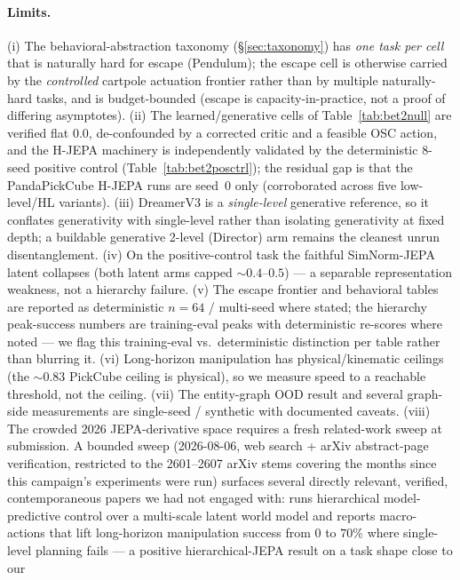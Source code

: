 \documentclass{article}
\begin{document}
\paragraph{Limits.}
(i) The behavioral-abstraction taxonomy (\S\ref{sec:taxonomy}) has
\emph{one task per cell} that is naturally hard for escape (Pendulum); the escape
cell is otherwise carried by the \emph{controlled} cartpole actuation frontier
rather than by multiple naturally-hard tasks, and is budget-bounded (escape is
capacity-in-practice, not a proof of differing asymptotes).
(ii) The learned/generative cells of Table~\ref{tab:bet2null} are verified flat
$0.0$, de-confounded by a corrected critic and a feasible OSC action, and the
H-JEPA machinery is independently validated by the deterministic $8$-seed positive
control (Table~\ref{tab:bet2posctrl}); the residual gap is that the PandaPickCube
H-JEPA runs are seed~0 only (corroborated across five low-level/HL variants).
(iii) DreamerV3 is a \emph{single-level} generative reference, so it conflates
generativity with single-level rather than isolating generativity at fixed depth;
a buildable generative 2-level (Director) arm remains the cleanest unrun
disentanglement. (iv) On the positive-control task the faithful SimNorm-JEPA latent
collapses (both latent arms capped ${\sim}0.4$--$0.5$) --- a separable
representation weakness, not a hierarchy failure.
(v) The escape frontier and behavioral tables are reported as deterministic
$n=64$ / multi-seed where stated; the hierarchy peak-success numbers are
training-eval peaks with deterministic re-scores where noted --- we flag this
training-eval vs.\ deterministic distinction per table rather than blurring it.
(vi) Long-horizon manipulation has physical/kinematic ceilings (the ${\sim}0.83$
PickCube ceiling is physical), so we measure speed to a reachable threshold, not
the ceiling. (vii) The entity-graph OOD result and several graph-side measurements
are single-seed / synthetic with documented caveats. (viii) The crowded 2026
JEPA-derivative space requires a fresh related-work sweep at submission. A bounded
sweep (2026-08-06, web search + arXiv abstract-page verification, restricted to
the 2601--2607 arXiv stems covering the months since this campaign's experiments
were run) surfaces several directly relevant, verified, contemporaneous papers we
had not engaged with: \citet{hwm2026} runs hierarchical model-predictive control
over a multi-scale latent world model and reports macro-actions that lift
long-horizon manipulation success from $0$ to $70\%$ where single-level planning
fails --- a positive hierarchical-JEPA result on a task shape close to our
\end{document}
